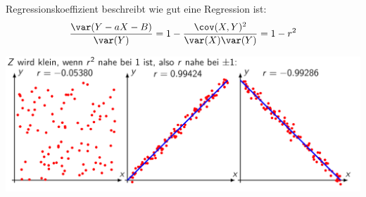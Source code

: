 Regressionskoeffizient beschreibt wie gut eine Regression ist:
\[
\frac{\var(Y-aX-B)}{\var(Y)} = 1 - \frac{\cov(X, Y)^2}{\var(X)\var(Y)} = 1 - r^2
\]


\includegraphics[width=\linewidth]{Images/regressionskoeffizient}

\label{covarianz_eg}
